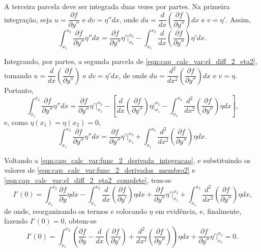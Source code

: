 \documentclass[
	12pt,				%
	openright,			%
    twoside,			%
	a4paper,			%
	chapter=TITLE,		%
	english,			%
	french,				%
	spanish,			%
	brazil				%
	]{abntex2}
\numberwithin{lema}{chapter}
\numberwithin{teorema}{chapter}
\numberwithin{definicao}{chapter}
\numberwithin{exemplo}{chapter}
\numberwithin{figure}{chapter}
\begin{document}
A terceira parcela deve ser integrada duas vezes por partes. Na primeira integração, seja $u=\dfrac{\partial f}{\partial y''}$ e $dv=\eta''dx$, onde 
$du=\dfrac{d}{dx} \left (
	\dfrac{\partial f}{\partial y''}
\right) dx$ e $v=\eta '$. Assim,
\begin{equation}
	\label{eqn:cap_calc_var:el_diff_2_eta2}
	\int_{x_1}^{x_2}
		\frac{\partial f}{\partial y''}
		\eta ''
	dx
	=
	\frac{\partial f}{\partial y''} \eta ' \Big |_{x_1}^{x_2}
	-
	\int_{x_1}^{x_2} \frac{d}{dx}
		\left ( 
			\frac{\partial f}{\partial y''}
		\right )
	\eta ' dx
	\text{.}
\end{equation}

Integrando, por partes, a segunda parcela de \eqref{eqn:cap_calc_var:el_diff_2_eta2}, tomando $u=\dfrac{d}{dx}\left (\dfrac{\partial f}{\partial y''}\right )$ e $dv=\eta'dx$, de onde $du=\dfrac{d^2}{dx^2}\left ( \dfrac{\partial f}{\partial y''} \right ) dx$ e $v=\eta$. Portanto,
$$
	\int_{x_1}^{x_2}
		\frac{\partial f}{\partial y''}
		\eta'' dx
	=
		\frac{\partial f}{\partial y''}\eta ' \Big |_{x_1}^{x_2}
		- \left [
		\frac{d}{dx} \left (
			\frac{\partial f}{\partial y''}
		\right ) \eta \Big |_{x_1}^{x_2}
		-
		\int_{x_1}^{x_2}
			\frac{d^2}{dx^2} \left (
				\frac{\partial f}{\partial y''}
			\right )
		\eta dx
	\right ]
	\text{,}
$$
e, como $\eta(x_1)=\eta(x_2)=0$,
\begin{equation}
	\label{eqn:cap_calc_var:el_diff_2_eta2_complete}
	\int_{x_1}^{x_2}
		\frac{\partial f}{\partial y''}
		\eta'' dx
	=
	\frac{\partial f}{\partial y''}\eta ' \Big |_{x_1}^{x_2}
	+
	\int_{x_1}^{x_2}
		\frac{d^2}{dx^2} \left (
			\frac{\partial f}{\partial y''}
		\right )
	\eta dx
	\text{.}
\end{equation}

Voltando a \eqref{eqn:cap_calc_var:func_2_derivada_integracao}, e substituindo os valores de \eqref{eqn:cap_calc_var:func_2_derivadas_membro2} e \eqref{eqn:cap_calc_var:el_diff_2_eta2_complete}, tem-se
$$
	I'(0)=
	\int_{x_1}^{x_2}
		\frac{\partial f}{\partial y}
		\eta dx
	-
	\int_{x_1}^{x_2}
		\frac{d}{dx}\left (
			\frac{\partial f}{\partial y'}
		\right ) \eta dx
	+
	\frac{\partial f}{\partial y''}\eta' \Big |_{x_1}^{x_2}
	+
	\int_{x_1}^{x_2}
		\frac{d^2}{dx^2}\left (
			\frac{\partial f}{\partial y''}
		\right ) \eta dx
	\text{,}
$$
de onde, reorganizando os termos e colocando $\eta$ em evidência, e, finalmente, fazendo $I'(0)=0$, obtem-se
\begin{equation}
	\label{eqn:cap_calc_var:cond_with_naturalbound}
	I'(0)=
	\int_{x_1}^{x_2}
	\left (
		\frac{\partial f}{\partial y}
	-
		\frac{d}{dx}\left (
			\frac{\partial f}{\partial y'}
		\right )
	+
		\frac{d^2}{dx^2}\left (
			\frac{\partial f}{\partial y''}
		\right )
	\right ) \eta dx
	+
	\frac{\partial f}{\partial y''}\eta' \Big |_{x_1}^{x_2}
	= 0
	\text{.}
\end{equation}
\end{document}
